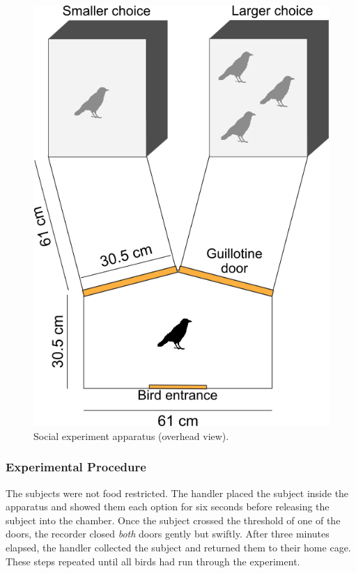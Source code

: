 \documentclass[
  ,doc,floatsintext]{apa6}
\begin{document}
\begin{figure}

{\centering \includegraphics[width=1\linewidth]{../figures/social_apparatus} 

}

\caption{Social experiment apparatus (overhead view).}\label{fig:socialapp}
\end{figure}

\hypertarget{experimental-procedure-1}{%
\subsubsection{Experimental Procedure}\label{experimental-procedure-1}}

The subjects were not food restricted. The handler placed the subject inside the apparatus and showed them each option for six seconds before releasing the subject into the chamber. Once the subject crossed the threshold of one of the doors, the recorder closed \emph{both} doors gently but swiftly. After three minutes elapsed, the handler collected the subject and returned them to their home cage. These steps repeated until all birds had run through the experiment.
\end{document}
